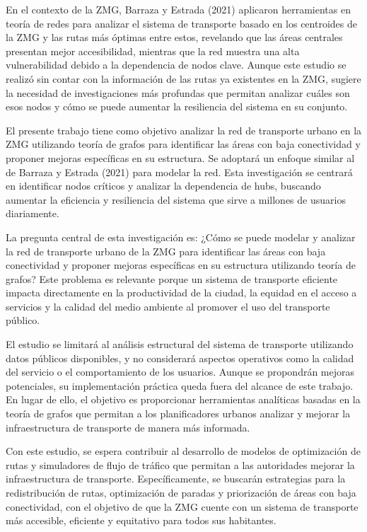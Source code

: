 \documentclass[12pt,oneside]{article}
\begin{document}
En el contexto de la ZMG, Barraza y Estrada (2021) aplicaron herramientas en teoría de redes para analizar el sistema de transporte basado en los centroides de la ZMG y las rutas más óptimas entre estos, revelando que las áreas centrales presentan mejor accesibilidad, mientras que la red muestra una alta vulnerabilidad debido a la dependencia de nodos clave. Aunque este estudio se realizó sin contar con la información de las rutas ya existentes en la ZMG, sugiere la necesidad de investigaciones más profundas que permitan analizar cuáles son esos nodos y cómo se puede aumentar la resiliencia del sistema en su conjunto.

El presente trabajo tiene como objetivo analizar la red de transporte urbano en la ZMG utilizando teoría de grafos para identificar las áreas con baja conectividad y proponer mejoras específicas en su estructura. Se adoptará un enfoque similar al de Barraza y Estrada (2021)  para modelar la red. Esta investigación se centrará en identificar nodos críticos y analizar la dependencia de hubs, buscando aumentar la eficiencia y resiliencia del sistema que sirve a millones de usuarios diariamente.

La pregunta central de esta investigación es: ¿Cómo se puede modelar y analizar la red de transporte urbano de la ZMG para identificar las áreas con baja conectividad y proponer mejoras específicas en su estructura utilizando teoría de grafos? Este problema es relevante porque un sistema de transporte eficiente impacta directamente en la productividad de la ciudad, la equidad en el acceso a servicios y la calidad del medio ambiente al promover el uso del transporte público.

El estudio se limitará al análisis estructural del sistema de transporte utilizando datos públicos disponibles, y no considerará aspectos operativos como la calidad del servicio o el comportamiento de los usuarios. Aunque se propondrán mejoras potenciales, su implementación práctica queda fuera del alcance de este trabajo. En lugar de ello, el objetivo es proporcionar herramientas analíticas basadas en la teoría de grafos que permitan a los planificadores urbanos analizar y mejorar la infraestructura de transporte de manera más informada.

Con este estudio, se espera contribuir al desarrollo de modelos de optimización de rutas y simuladores de flujo de tráfico que permitan a las autoridades mejorar la infraestructura de transporte. Específicamente, se buscarán estrategias para la redistribución de rutas, optimización de paradas y priorización de áreas con baja conectividad, con el objetivo de que la ZMG cuente con un sistema de transporte más accesible, eficiente y equitativo para todos sus habitantes.
\end{document}
